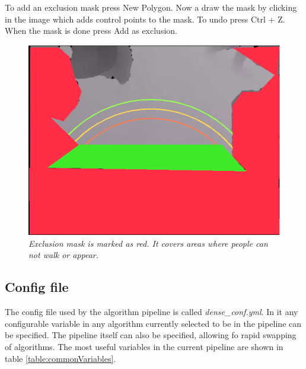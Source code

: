 To add an exclusion mask press New Polygon. Now a draw the mask by clicking in the image which adds control points to the mask. To undo press Ctrl + Z. When the mask is done press Add as exclusion.

\begin{figure}[H]
	\centering
	\includegraphics[width=\linewidth]{images/Manual1.png}
	\caption[Exclusion mask]{\textit{Exclusion mask is marked as red. It covers areas where people can not walk or appear.}}
	\label{fig:exMask}  %
\end{figure}

\newpage
\subsection{Config file}
The config file used by the algorithm pipeline is called \textit{dense\_conf.yml}. In it any configurable variable in any algorithm currently selected to be in the pipeline can be specified. The pipeline itself can also be specified, allowing fo rapid swapping of algorithms. The most useful variables in the current pipeline are shown in table \ref{table:commonVariables}.\\

